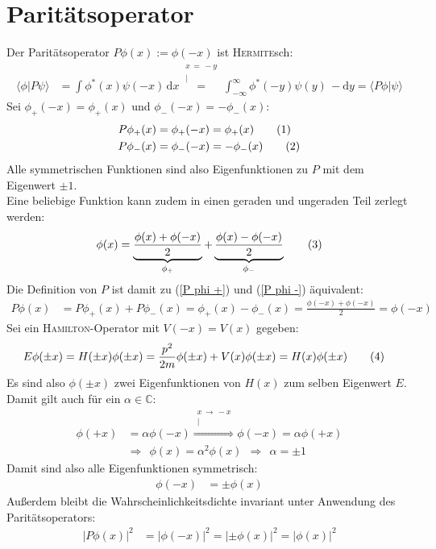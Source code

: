 \documentclass[a4paper,12pt]{article}
\newcommand\numberthis{\addtocounter{equation}{1}\tag{\theequation}}
\newcommand{\kom}{}
\newcommand{\brak}{}
\newcommand{\intx}{}
\begin{document}
\section{Paritätsoperator}
Der Paritätsoperator $P\phi(x):=\phi(-x)$ ist \textsc{Hermite}sch:
\begin{align*}
\brak\langle {\phi}| {P\psi}\rangle&=\int \phi^\ast(x)\psi(-x)\,\mathrm{d}x\kom\overset{\substack{{x\,=\,-y} \\ |}}{=}\intx\int_{-\infty}^{\infty}\phi^\ast(-y)\psi(y)\,-\mathrm{d}y=\brak\langle {P\phi}| {\psi}\rangle
\end{align*}
Sei $\phi_+(-x)=\phi_+(x)$ und $\phi_-(-x)=-\phi_-(x)$:
\begin{align*}
P\phi_+(x)&=\phi_+(-x)=\phi_+(x) \numberthis\label{P phi +}\\
P\phi_-(x)&=\phi_-(-x)=-\phi_-(x) \numberthis\label{P phi -}
\end{align*}
Alle symmetrischen Funktionen sind also Eigenfunktionen zu $P$ mit dem Eigenwert $\pm 1$. \\
Eine beliebige Funktion kann zudem in einen geraden und ungeraden Teil zerlegt werden:
\begin{align*}
\phi(x)=\underbrace{\frac{\phi(x)+\phi(-x)}{2}}_{\phi_+}+\underbrace{\frac{\phi(x)-\phi(-x)}{2}}_{\phi_-} \numberthis\label{phi in phi +-}
\end{align*}
Die Definition von $P$ ist damit zu (\ref{P phi +}) und (\ref{P phi -}) äquivalent:
\begin{align*}
P\phi(x)&=P\phi_+(x)+P\phi_-(x)=\phi_+(x)-\phi_-(x)=\frac{\phi(-x)+\phi(-x)}{2}=\phi(-x)
\end{align*}
Sei ein \textsc{Hamilton}-Operator mit $V(-x)=V(x)$ gegeben:
\begin{align*}
E\phi(\pm x)&=H(\pm x)\phi(\pm x)=\frac{p^2}{2m}\phi(\pm x)+V(x)\phi(\pm x)=H(x)\phi(\pm x) \numberthis\label{H phi +-}
\end{align*}
Es sind also $\phi(\pm x)$ zwei Eigenfunktionen von $H(x)$ zum selben Eigenwert $E$. Damit gilt auch für ein $\alpha\in\mathbb{C}$:
\begin{align*}
\phi(+x)&=\alpha\phi(-x)\kom\overset{\substack{{x\,\rightarrow\, -x} \\ |}}{\ \ \Rightarrow\ \ }\phi(-x)=\alpha\phi(+x) \\
&\Rightarrow\ \ \phi(x)=\alpha^2\phi(x)\ \ \Rightarrow\ \ \alpha =\pm 1
\end{align*}
Damit sind also alle Eigenfunktionen symmetrisch:
\begin{align*}
\phi(-x)&=\pm \phi(x)
\end{align*}
Außerdem bleibt die Wahrscheinlichkeitsdichte invariant unter Anwendung des Paritätsoperators:
\begin{align*}
|P\phi(x)|^2&=|\phi(-x)|^2=|\pm\phi(x)|^2=|\phi(x)|^2
\end{align*}
\end{document}
